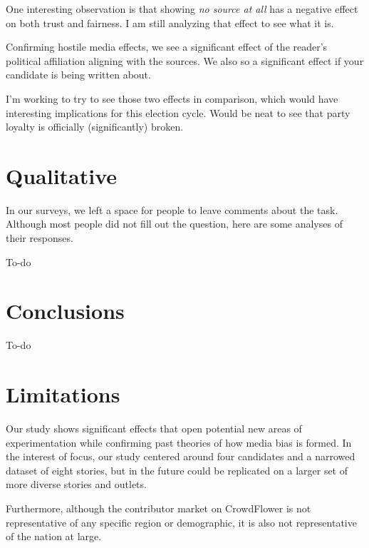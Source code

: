 One interesting observation is that showing \emph{no source at all} has a negative effect on both trust and fairness. I am still analyzing that effect to see what it is.
 
Confirming hostile media effects, we see a significant effect of the reader's political affiliation aligning with the sources. We also so a significant effect if your candidate is being written about. 

I'm working to try to see those two effects in comparison, which would have interesting implications for this election cycle. Would be neat to see that party loyalty is officially (significantly) broken.

\section{Qualitative}
In our surveys, we left a space for people to leave comments about the task. Although most people did not fill out the question, here are some analyses of their responses.

To-do

\section{Conclusions}

To-do

\section{Limitations}

Our study shows significant effects that open potential new areas of experimentation while confirming past theories of how media bias is formed. In the interest of focus, our study centered around four candidates and a narrowed dataset of eight stories, but in the future could be replicated on a larger set of more diverse stories and outlets. 

Furthermore, although the contributor market on CrowdFlower is not representative of any specific region or demographic, it is also not representative of the nation at large.